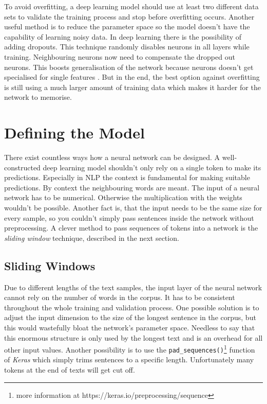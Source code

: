To avoid overfitting, a deep learning model should use at least two different data sets to validate the training process and stop before overfitting occurs. Another useful method is to reduce the parameter space so the model doesn't have the capability of learning noisy data. In deep learning there is the possibility of adding dropouts. This technique randomly disables neurons in all layers while training. Neighbouring neurons now need to compensate the dropped out neurons. This boosts generalisation of the network because neurons doesn't get specialised for single features \cite{drop14}. But in the end, the best option against overfitting is still using a much larger amount of training data which makes it harder for the network to memorise.

\section{Defining the Model}

There exist countless ways how a neural network can be designed. A well-constructed deep learning model shouldn't only rely on a single token to make its predictions. Especially in NLP the context is fundamental for making suitable predictions. By context the neighbouring words are meant. The input of a neural network has to be numerical. Otherwise the multiplication with the weights wouldn't be possible. Another fact is, that the input needs to be the same size for every sample, so you couldn't simply pass sentences inside the network without preprocessing. A clever method to pass sequences of tokens into a network is the \emph{sliding window} technique, described in the next section.

\subsection{Sliding Windows}
\label{chap:sliding-window}

Due to different lengths of the text samples, the input layer of the neural network cannot rely on the number of words in the corpus. It has to be consistent throughout the whole training and validation process. One possible solution is to adjust the input dimension to the size of the longest sentence in the corpus, but this would wastefully bloat the network's parameter space. Needless to say that this enormous structure is only used by the longest text and is an overhead for all other input values. Another possibility is to use the \verb|pad_sequences()|\footnote{more information at https://keras.io/preprocessing/sequence} function of \emph{Keras} which simply trims sentences to a specific length. Unfortunately many tokens at the end of texts will get cut off.

